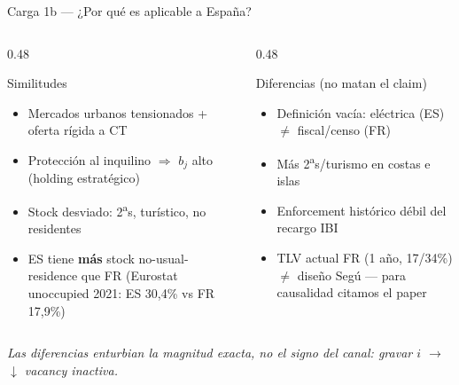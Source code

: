 \documentclass[aspectratio=169,11pt]{beamer}
\begin{document}
\begin{frame}{Carga 1b --- ¿Por qué es aplicable a España?}
  \begin{columns}[T]
    \begin{column}{0.48\textwidth}
      \begin{block}{Similitudes}
        \begin{itemize}\setlength\itemsep{0.3em}
          \item Mercados urbanos tensionados + oferta rígida a CT
          \item Protección al inquilino $\Rightarrow$ $b_j$ alto (holding estratégico)
          \item Stock desviado: 2\textsuperscript{a}s, turístico, no residentes
          \item ES tiene \textbf{más} stock no-usual-residence que FR (Eurostat unoccupied 2021: ES 30,4\% vs FR 17,9\%)
        \end{itemize}
      \end{block}
    \end{column}
    \begin{column}{0.48\textwidth}
      \begin{alertblock}{Diferencias (no matan el claim)}
        \begin{itemize}\setlength\itemsep{0.3em}
          \item Definición vacía: eléctrica (ES) $\neq$ fiscal/censo (FR)
          \item Más 2\textsuperscript{a}s/turismo en costas e islas
          \item Enforcement histórico débil del recargo IBI
          \item TLV actual FR (1 año, 17/34\%) $\neq$ diseño Segú --- para causalidad citamos el paper
        \end{itemize}
      \end{alertblock}
    \end{column}
  \end{columns}
  \vspace{0.5em}
  \textit{Las diferencias enturbian la magnitud exacta, no el signo del canal:
  gravar $i$ $\rightarrow$ $\downarrow$ vacancy inactiva.}
\end{frame}
\end{document}
